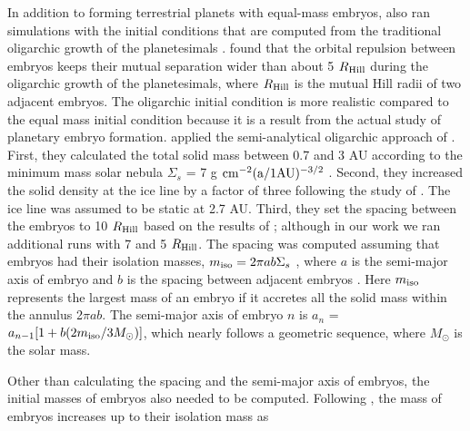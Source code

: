 \documentclass{aa}
\begin{document}
In addition to forming terrestrial planets with equal-mass embryos, \cite{brasser2016analysis} also ran simulations with the initial conditions that are computed from the traditional oligarchic growth of the planetesimals \citep{kokubo1998oligarchic}. \cite{kokubo1998oligarchic} found that the orbital repulsion between embryos keeps their mutual separation wider than about 5 $R_{\rm Hill}$ during the oligarchic growth of the planetesimals, where $R_{\rm Hill}$ is the mutual Hill radii of two adjacent embryos. The oligarchic initial condition is more realistic compared to the equal mass initial condition because it is a result from the actual study of planetary embryo formation. \cite{brasser2016analysis} applied the semi-analytical oligarchic approach of \cite{chambers2006semi}. First, they calculated the total solid mass between 0.7 and 3 AU according to the minimum mass solar nebula $\Sigma_s$ = 7 g $\rm cm^{-2} \rm (a/1 AU)^{-3/2}$ \citep{hayashi1981structure}. Second, they increased the solid density at the ice line by a factor of three following the study of \cite{ogihara2009n}. The ice line was assumed to be static at 2.7 AU. Third, they set the spacing between the embryos to 10 $R_{\rm Hill}$ based on the results of \cite{kokubo1998oligarchic}; although in our work we ran additional runs with 7 and 5 $R_{\rm Hill}$. The spacing was computed assuming that embryos had their isolation masses, $m_{\rm iso} = 2\pi ab \Sigma_s$ , where $a$ is the semi-major axis of embryo and $b$ is the spacing between adjacent embryos \citep{chambers2006semi}. Here $m_{\rm iso}$ represents the largest mass of an embryo if it accretes all the solid mass within the annulus 2$\pi ab$. The semi-major axis of embryo $n$ is $a_n$ = $a_{n-1}[1 + b(2m_{\rm iso}/3M_{\odot})]$, which nearly follows a geometric sequence, where $M_{\odot}$ is the solar mass.

Other than calculating the spacing and the semi-major axis of embryos, the initial masses of embryos also needed to be computed. Following \cite{chambers2006semi}, the mass of embryos increases up to their isolation mass as 
\end{document}
